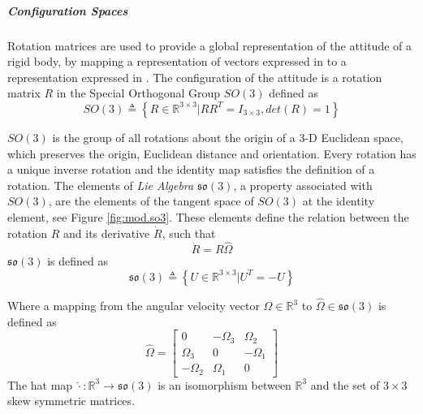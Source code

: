 \subparagraph{Configuration Spaces}
Rotation matrices are used to provide a global representation of the attitude of a rigid body, by mapping a representation of vectors expressed in \BF to a representation expressed in \IF \cite{Chaturvedi2011,Murray1994}. 
The configuration of the  attitude is a rotation matrix $ R $ in the Special Orthogonal Group $ SO(3) $ defined as
\begin{equation}\label{key}
SO(3) \triangleq \left\lbrace R\in\mathbb{R}^{3\times3}|RR^T=I_{3\times3}, det(R)=1\right\rbrace 
\end{equation}


$ SO(3) $ is the group of all rotations about the origin of a 3-D Euclidean space, which preserves the origin, Euclidean distance and orientation.
Every rotation has a unique inverse rotation and the identity map satisfies the definition of a rotation. The elements of \textit{Lie Algebra} $ \mathfrak{so}(3) $, a property associated with $ SO(3) $, are the elements of the tangent space of $ SO(3) $ at the identity element, see Figure \ref{fig:mod.so3}. 
These elements define the relation between the rotation $ R $ and its derivative $ \dot{R} $, such that
\begin{equation}\label{key}
\dot{R} = R\hat{\Omega}
\end{equation}
$ \mathfrak{so}(3) $ is defined as
\begin{equation}\label{key}
\mathfrak{so}(3) \triangleq \left\lbrace U\in \mathbb{R}^{3\times 3}|U^T=-U\right\rbrace
\end{equation}

Where a mapping from the angular velocity vector $ \Omega\in\mathbb{R}^3 $ to $ \hat{\Omega}\in\mathfrak{so}(3) $ is defined as \cite{Murray1994}
\begin{equation}\label{eq:mod.hatOmega}
\hat{\Omega}=\begin{bmatrix}
0&-\Omega_3&\Omega_2\\
\Omega_3&0&-\Omega_1\\
-\Omega_2&\Omega_1&0
\end{bmatrix}
\end{equation}
The hat map $ \hat{\cdot}:\mathbb{R}^3\rightarrow \mathfrak{so}(3)$ is an isomorphism between $ \mathbb{R}^3 $ and the set of $ 3\times 3 $ skew symmetric matrices.

